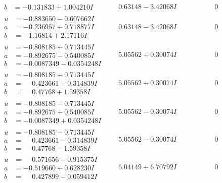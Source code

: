 \documentclass[1p]{elsarticle_modified}
\theoremstyle{definition}
\begin{document}
$$\begin{array}{c|c|c}
\begin{aligned}
b &= -0.131833 + 1.004210 I\end{aligned}
 & \phantom{-}0.63148 - 3.42068 I & \phantom{-0.000000 } 0 \\ \hline\begin{aligned}
u &= -0.883650 - 0.607662 I \\
a &= -0.236957 + 0.718877 I \\
b &= -1.16814 + 2.17116 I\end{aligned}
 & \phantom{-}0.63148 - 3.42068 I & \phantom{-0.000000 } 0 \\ \hline\begin{aligned}
u &= -0.808185 + 0.713445 I \\
a &= -0.892675 - 0.540085 I \\
b &= -0.0087349 - 0.0354248 I\end{aligned}
 & \phantom{-}5.05562 + 0.30074 I & \phantom{-0.000000 } 0 \\ \hline\begin{aligned}
u &= -0.808185 + 0.713445 I \\
a &= \phantom{-}0.423661 + 0.314839 I \\
b &= \phantom{-}0.47768 + 1.59358 I\end{aligned}
 & \phantom{-}5.05562 + 0.30074 I & \phantom{-0.000000 } 0 \\ \hline\begin{aligned}
u &= -0.808185 - 0.713445 I \\
a &= -0.892675 + 0.540085 I \\
b &= -0.0087349 + 0.0354248 I\end{aligned}
 & \phantom{-}5.05562 - 0.30074 I & \phantom{-0.000000 } 0 \\ \hline\begin{aligned}
u &= -0.808185 - 0.713445 I \\
a &= \phantom{-}0.423661 - 0.314839 I \\
b &= \phantom{-}0.47768 - 1.59358 I\end{aligned}
 & \phantom{-}5.05562 - 0.30074 I & \phantom{-0.000000 } 0 \\ \hline\begin{aligned}
u &= \phantom{-}0.571656 + 0.915375 I \\
a &= -0.519660 + 0.628230 I \\
b &= \phantom{-}0.427899 - 0.059412 I\end{aligned}
 & \phantom{-}5.04149 + 6.70792 I & \phantom{-0.000000 } 0 \\ \hline\begin{aligned}

\end{aligned}
\end{array}$$
\end{document}
